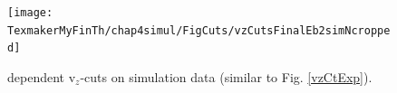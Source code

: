 \begin{figure}[H]%
  \centering
\leavevmode \texttt{[image: TexmakerMyFinTh/chap4simul/FigCuts/vzCutsFinalEb2simNcropped]}  %
\caption[v$_z$ cuts (Sim.)]{\qsqs dependent v$_z$-cuts on simulation data (similar to Fig. \ref{vzCtExp}).}
\label{vzCtSim}
\end{figure}



